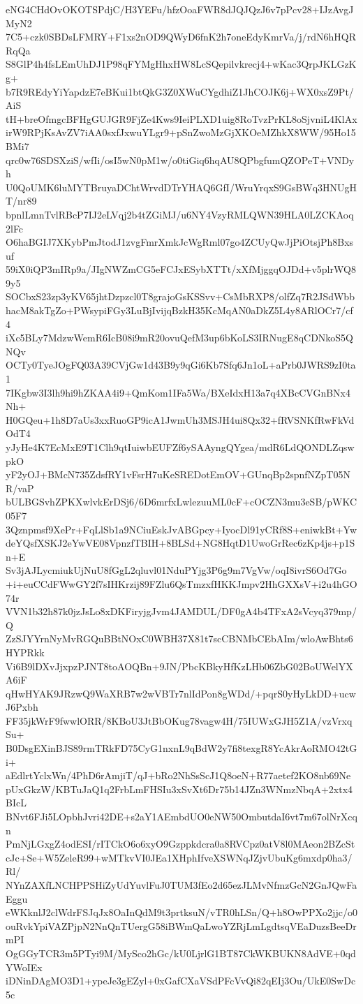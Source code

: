 eNG4CHdOvOKOTSPdjC/H3YEFu/hfzOoaFWR8dJQJQzJ6v7pPcv28+IJzAvgJMyN2
7C5+czk0SBDsLFMRY+F1xs2nOD9QWyD6fnK2h7oneEdyKmrVa/j/rdN6hHQRRqQa
S8GlP4h4fsLEmUhDJ1P98qFYMgHhxHW8LcSQepilvkrecj4+wKac3QrpJKLGzKg+
b7R9REdyYiYapdzE7eBKui1btQkG3Z0XWuCYgdhiZ1JhCOJK6j+WX0xsZ9Pt/AiS
tH+breOfmgcBFHgGUJGR9FjZe4Kws9IeiPLXD1uig8RoTvzPrKL8oSjvniL4KlAx
irW9RPjKsAvZV7iAA0sxfJxwuYLgr9+pSnZwoMzGjXKOeMZhkX8WW/95Ho15BMi7
qrc0w76SDSXziS/wfIi/osI5wN0pM1w/o0tiGiq6hqAU8QPbgfumQZOPeT+VNDyh
U0QoUMK6luMYTBruyaDChtWrvdDTrYHAQ6GfI/WruYrqxS9GsBWq3HNUgHT/nr89
bpnlLmnTvlRBcP7IJ2eLVqj2b4tZGiMJ/u6NY4VzyRMLQWN39HLA0LZCKAoq2lFc
O6haBGIJ7XKybPmJtodJ1zvgFmrXmkJcWgRml07go4ZCUyQwJjPiOtsjPh8Bxsuf
59iX0iQP3mIRp9a/JIgNWZmCG5eFCJxESybXTTt/xXfMjggqOJDd+v5plrWQ89y5
SOCbxS23zp3yKV65jhtDzpzcl0T8grajoGsKSSvv+CsMbRXP8/olfZq7R2JSdWbb
hacM8akTgZo+PWsypiFGy3LuBjIvijqBzkH35KcMqAN0aDkZ5L4y8ARlOCr7/cf4
iXc5BLy7MdzwWemR6IcB08i9mR20ovuQefM3up6bKoLS3IRNugE8qCDNkoS5QNQv
OCTy0TyeJOgFQ03A39CVjGw1d43B9y9qGi6Kb7Sfq6Jn1oL+aPrb0JWRS9zI0ta1
7IKgbw3I3lh9hi9hZKAA4i9+QmKom1IFa5Wa/BXeIdxH13a7q4XBcCVGnBNx4Nh+
H0GQeu+1h8D7aUs3xxRuoGP9icA1JwmUh3MSJH4ui8Qx32+fRVSNKfRwFkVdOdT4
yJyHe4K7EcMxE9T1Clh9qtIuiwbEUFZf6ySAAyngQYgea/mdR6LdQONDLZqswpkO
yF2yOJ+BMcN735ZdsfRY1vFsrH7uKeSREDotEmOV+GUnqBp2spnfNZpT05NR/vaP
bULBGSvhZPKXwlvkErDSj6/6D6mrfxLwlezuuML0cF+cOCZN3mu3eSB/pWKC05F7
3Qznpmsf9XePr+FqLlSb1a9NCiuEskJvABGpcy+IyocDl91yCRf8S+eniwkBt+Yw
deYQsfXSKJ2eYwVE08VpnzfTBIH+8BLSd+NG8HqtD1UwoGrRec6zKp4js+p1Sn+E
Sv3jAJLycmiukUjNuU8fGgL2qluvl01NduPYjg3P6g9m7VgVw/oqI8ivrS6Od7Go
+i+euCCdFWwGY2f7sIHKrzij89FZlu6QsTmzxfHKKJmpv2HhGXXsV+i2u4hGO74r
VVN1b32h87k0jzJsLo8xDKFiryjgJvm4JAMDUL/DF0gA4b4TFxA2sVcyq379mp/Q
ZzSJYYrnNyMvRGQuBBtNOxC0WBH37X81t7scCBNMbCEbAIm/wloAwBhts6HYPRkk
Vi6B9lDXvJjxpzPJNT8toAOQBn+9JN/PbcKBkyHfKzLHb06ZbG02BoUWelYXA6iF
qHwHYAK9JRzwQ9WaXRB7w2wVBTr7nlIdPon8gWDd/+pqrS0yHyLkDD+ucwJ6Pxbh
FF35jkWrF9fwwlORR/8KBoU3JtBbOKug78vagw4H/75IUWxGJH5Z1A/vzVrxqSu+
B0DsgEXinBJS89rmTRkFD75CyG1nxnL9qBdW2y7fi8texgR8YcAkrAoRMO42tGi+
aEdlrtYclxWn/4PhD6rAmjiT/qJ+bRo2NhSsScJ1Q8oeN+R77aetef2KO8nb69Ne
pUxGkzW/KBTuJaQ1q2FrbLmFHSIu3xSvXt6Dr75b14JZn3WNmzNbqA+2xtx4BIcL
BNvt6FJi5LOpbhJvri42DE+s2aY1AEmbdUO0eNW50OmbutdaI6vt7m67olNrXcqn
PmNjLGxgZ4odESI/rITCkO6o6xyO9Gzppkdcra0a8RVCpz0atV8l0MAeon2BZcSt
cJc+Se+W5ZeleR99+wMTkvVI0JEa1XHphIfveXSWNqJZjvUbuKg6mxdp0ha3/Rl/
NYnZAXfLNCHPPSHiZyUdYuvlFuJ0TUM3fEo2d65ezJLMvNfmzGcN2GnJQwFaEggu
eWKknlJ2clWdrFSJqJx8OaInQdM9t3prtksuN/vTR0hLSn/Q+h8OwPPXo2jjc/o0
ouRvkYpiVAZPjpN2NnQnTUergG58iBWmQaLwoYZRjLmLgdtsqVEaDuzsBeeDrmPI
OgGGyTCR3m5PTyi9M/MySco2hGc/kU0LjrlG1BT87CkWKBUKN8AdVE+0qdYWoIEx
iDNinDAgMO3D1+ypeJe3gEZyl+0xGafCXaVSdPFcVvQi82qEIj3Ou/UkE0SwDc5c
